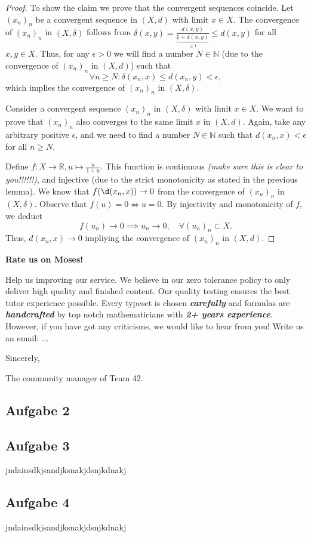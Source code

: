 \documentclass[a4paper]{article}
\renewcommand{\hline}{\noindent\makebox[\linewidth]{\rule{12cm}{1pt}}}
\newcommand{\vip}[1]{\textit{\textbf{#1}}}
\begin{document}
\begin{proof}
To show the claim we prove that the convergent sequences coincide. Let $(x_n)_n$ be a convergent sequence in $(X,d)$ with limit $x \in X$. The convergence of $(x_n)_n$ in $(X, \delta)$ follows from $\delta(x,y) = \frac{d(x,y)}{\underbrace{1+d(x,y)}_{\geq 1}} \leq d(x,y)$ for all $x,y \in X$. Thus, for any $\epsilon > 0$ we will find a number $N \in \mathbb N$ (due to the convergence of $(x_n)_n$ in $(X,d)$) such that 
\[
	\forall n \geq N: \delta(x_n,x) \leq d(x_n,y) < \epsilon,
\]
which implies the convergence of $(x_n)_n$ in $(X, \delta)$.

Consider a convergent sequence $(x_n)_n$ in $(X,\delta)$ with limit $x \in X$. We want to prove that $(x_n)_n$ also converges to the same limit $x$ in $(X,d)$. Again, take any arbitrary positive $\epsilon$, and we need to find a number $N \in \mathbb N$ such that $d(x_n,x) < \epsilon$ for all $n \geq N$. 

Define $f: X \to \mathbb R, u \mapsto \frac{u}{1+u}$. This function is continuous \emph{(make sure this is clear to you!!!!!!)}, and injective (due to the strict monotonicity as stated in the previous lemma). We know that $f(\d(x_n,x)) \to 0$ from the convergence of $(x_n)_n$ in $(X,\delta)$. Observe that $f(u) = 0 \iff u = 0$. By injectivity and monotonicity of $f$, we deduct
\[
	f(u_n) \to 0 \implies u_n \to 0, \quad \forall (u_n)_n \subset X.
\]
Thus, $d(x_n,x) \to 0$ impliying the convergence of $(x_n)_n$ in $(X,d)$.
\end{proof}

\hline

\hline

\textbf{Rate us on Moses!} 

Help us improving our service. We believe in our zero tolerance policy to only deliver high quality and finished content. Our quality testing ensures the best tutor experience possible. Every typeset is chosen \vip{carefully} and formulas are \vip{handcrafted} by top notch mathematicians with \vip{2+ years experience}. However, if you have got any criticisms, we would like to hear from you! Write us an email: ...

Sincerely,

The community manager of Team 42.

\hline

\hline



\subsection*{Aufgabe 2}


\subsection*{Aufgabe 3}
jndainsdkjsandjksnakjdsnjkdnakj

\subsection*{Aufgabe 4}
jndainsdkjsandjksnakjdsnjkdnakj
\end{document}

